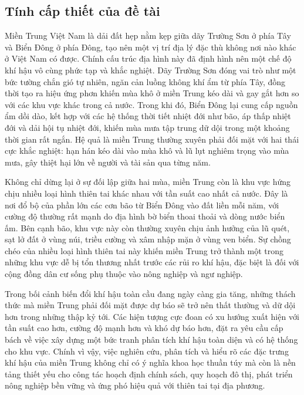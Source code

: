 \documentclass[12pt,a4paper]{article}
\begin{document}
\subsection{Tính cấp thiết của đề tài}

Miền Trung Việt Nam là dải đất hẹp nằm kẹp giữa dãy Trường Sơn ở phía Tây và Biển Đông ở phía Đông, tạo nên một vị trí địa lý đặc thù không nơi nào khác ở Việt Nam có được. Chính cấu trúc địa hình này đã định hình nên một chế độ khí hậu vô cùng phức tạp và khắc nghiệt. Dãy Trường Sơn đóng vai trò như một bức tường chắn gió tự nhiên, ngăn cản luồng không khí ẩm từ phía Tây, đồng thời tạo ra hiệu ứng phơn khiến mùa khô ở miền Trung kéo dài và gay gắt hơn so với các khu vực khác trong cả nước. Trong khi đó, Biển Đông lại cung cấp nguồn ẩm dồi dào, kết hợp với các hệ thống thời tiết nhiệt đới như bão, áp thấp nhiệt đới và dải hội tụ nhiệt đới, khiến mùa mưa tập trung dữ dội trong một khoảng thời gian rất ngắn. Hệ quả là miền Trung thường xuyên phải đối mặt với hai thái cực khắc nghiệt: hạn hán kéo dài vào mùa khô và lũ lụt nghiêm trọng vào mùa mưa, gây thiệt hại lớn về người và tài sản qua từng năm.

Không chỉ dừng lại ở sự đối lập giữa hai mùa, miền Trung còn là khu vực hứng chịu nhiều loại hình thiên tai khác nhau với tần suất cao nhất cả nước. Đây là nơi đổ bộ của phần lớn các cơn bão từ Biển Đông vào đất liền mỗi năm, với cường độ thường rất mạnh do địa hình bờ biển thoai thoải và dòng nước biển ấm. Bên cạnh bão, khu vực này còn thường xuyên chịu ảnh hưởng của lũ quét, sạt lở đất ở vùng núi, triều cường và xâm nhập mặn ở vùng ven biển. Sự chồng chéo của nhiều loại hình thiên tai này khiến miền Trung trở thành một trong những khu vực dễ bị tổn thương nhất trước các rủi ro khí hậu, đặc biệt là đối với cộng đồng dân cư sống phụ thuộc vào nông nghiệp và ngư nghiệp.

Trong bối cảnh biến đổi khí hậu toàn cầu đang ngày càng gia tăng, những thách thức mà miền Trung phải đối mặt được dự báo sẽ trở nên thất thường và dữ dội hơn trong những thập kỷ tới. Các hiện tượng cực đoan có xu hướng xuất hiện với tần suất cao hơn, cường độ mạnh hơn và khó dự báo hơn, đặt ra yêu cầu cấp bách về việc xây dựng một bức tranh phân tích khí hậu toàn diện và có hệ thống cho khu vực. Chính vì vậy, việc nghiên cứu, phân tích và hiểu rõ các đặc trưng khí hậu của miền Trung không chỉ có ý nghĩa khoa học thuần túy mà còn là nền tảng thiết yếu cho công tác hoạch định chính sách, quy hoạch đô thị, phát triển nông nghiệp bền vững và ứng phó hiệu quả với thiên tai tại địa phương.
\end{document}
